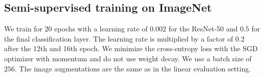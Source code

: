\subsection{Semi-supervised training on ImageNet}
\label{sec:semisupervised_evaluation}
We train for $20$ epochs with a learning rate of $0.002$ for the ResNet-50 and $0.5$ for the final classification layer. The learning rate is multiplied by a factor of $0.2$ after the 12th and 16th epoch. We minimize the cross-entropy loss with the SGD optimizer with momentum and do not use weight decay. We use a batch size of $256$. The image augmentations are the same as in the linear evaluation setting.
